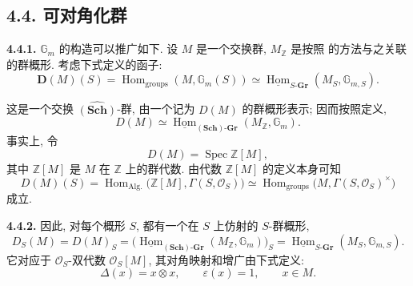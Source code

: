 
\subsection*{4.4. 可对角化群}

\medskip
\noindent{}\textbf{4.4.1.}
\(\mathbb G_m\) 的构造可以推广如下. 设 \(M\) 是一个交换群,
\(M_{\mathbb Z}\) 是按照 
的方法与之关联的群概形. 考虑下式定义的函子:
\[
  \mathbf D(M)(S)
    =\operatorname{Hom}_{\mathrm{groups}}(M,\mathbb G_m(S))
    \simeq
      \underline{\operatorname{Hom}}_{S\text{-}\mathbf{Gr}}
        (M_S,\mathbb G_{m,S}).
\]

这是一个交换 \(\widehat{(\mathbf{Sch})}\)-群, 由一个记为 \(D(M)\)
的群概形表示; 因而按照定义,
\[
  D(M)\simeq
  \underline{\operatorname{Hom}}_{(\mathbf{Sch})\text{-}\mathbf{Gr}}
    (M_{\mathbb Z},\mathbb G_m).
\]
事实上, 令
\[
  D(M)=\operatorname{Spec}\mathbb Z[M],
\]
其中 \(\mathbb Z[M]\) 是 \(M\) 在 \(\mathbb Z\) 上的群代数.
由代数 \(\mathbb Z[M]\) 的定义本身可知
\[
  D(M)(S)
    =\operatorname{Hom}_{\mathrm{Alg.}}
       \bigl(\mathbb Z[M],\Gamma(S,\mathcal O_S)\bigr)
    \simeq
      \operatorname{Hom}_{\mathrm{groups}}
       \bigl(M,\Gamma(S,\mathcal O_S)^{\times}\bigr)
\]
成立.

\medskip
\noindent{}\textbf{4.4.2.}
因此, 对每个概形 \(S\), 都有一个在 \(S\) 上仿射的 \(S\)-群概形,
\[
  D_S(M)=D(M)_S
    =\bigl(
      \underline{\operatorname{Hom}}_{(\mathbf{Sch})\text{-}\mathbf{Gr}}
        (M_{\mathbb Z},\mathbb G_m)
      \bigr)_S
    =\underline{\operatorname{Hom}}_{S\text{-}\mathbf{Gr}}
       (M_S,\mathbb G_{m,S}).
\]
它对应于 \(\mathcal O_S\)-双代数 \(\mathcal O_S[M]\),
其对角映射和增广由下式定义:
\[
  \Delta(x)=x\otimes x,
  \qquad
  \varepsilon(x)=1,
  \qquad x\in M.
\]

